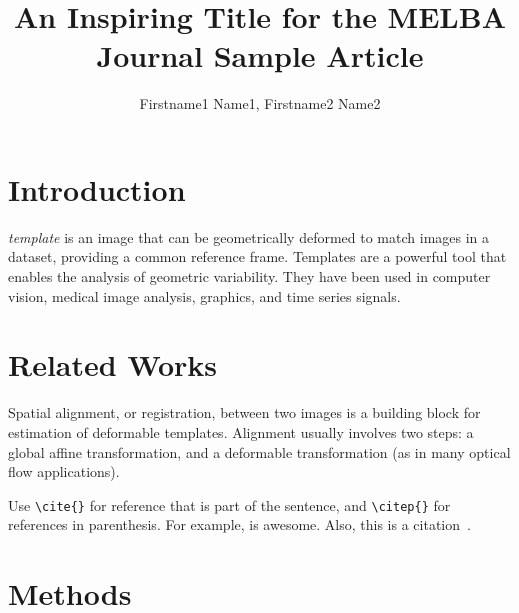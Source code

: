 \documentclass{melba}
\title{An Inspiring Title for the MELBA Journal Sample Article}
\author{
	\firstname Firstname1 \surname Name1\aff{1,3},
	\name Firstname2 Name2\aff{2,3}\orcid{0000-1111-2222-3333}
}
\begin{document}
\twocolumn[\maketitle]


\section{Introduction}
	 \emph{template} is an image that can be geometrically deformed to match images in a dataset, providing a common reference frame. Templates are a powerful tool that enables the analysis of geometric variability. They have been used in computer vision, medical image analysis, graphics, and time series signals.


\section{Related Works}
	Spatial alignment, or registration, between two images is a building block for estimation of deformable templates. Alignment usually involves two steps: a global affine transformation, and a deformable transformation (as in many optical flow applications).

	Use \verb|\cite{}| for reference that is part of the sentence, and \verb|\citep{}| for references in parenthesis. For example, \cite{viola1997alignment} is awesome. Also, this is a citation~\citep{viola1997alignment}.



\section{Methods}
\end{document}
